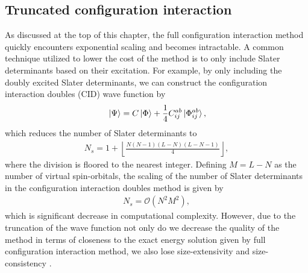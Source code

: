         \subsection{Truncated configuration interaction}
            \label{sub:truncated-configuration-interaction}
            As discussed at the top of this chapter, the full configuration
            interaction method quickly encounters exponential scaling and
            becomes intractable.
            A common technique utilized to lower the cost of the method is to
            only include Slater determinants based on their excitation.
            For example, by only including the doubly excited Slater
            determinants, we can construct the configuration interaction doubles
            (CID) wave function by
            \begin{align}
                \ket*{\Psi} = C\ket*{\Phi}
                + \frac{1}{4} C^{ab}_{ij} \ket*{\Phi^{ab}_{ij}},
            \end{align}
            which reduces the number of Slater determinants to
            \begin{align}
                N_s = 1 + \left\lfloor\frac{N(N - 1)(L - N)(L - N -
                1)}{4}\right\rfloor,
            \end{align}
            where the division is floored to the nearest integer.
            Defining $M = L - N$ as the number of virtual spin-orbitals, the
            scaling of the number of Slater determinants in the configuration
            interaction doubles method is given by
            \begin{align}
                N_s = \mathcal{O}(N^2 M^2),
            \end{align}
            which is significant decrease in computational complexity.
            However, due to the truncation of the wave function not only do we
            decrease the quality of the method in terms of closeness to the
            exact energy solution given by full configuration interaction
            method, we also lose size-extensivity and size-consistency
            \cite{crawford2000introduction, helgaker-molecular}.

